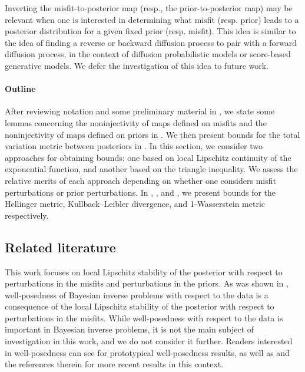 \documentclass[a4paper]{scrartcl}
\theoremstyle{definition}
\numberwithin{equation}{section}
\begin{document}
Inverting the misfit-to-posterior map (resp., the prior-to-posterior map) may be relevant when one is interested in determining what misfit (resp. prior) leads to a posterior distribution for a given fixed prior (resp. misfit).
This idea is similar to the idea of finding a reverse or backward diffusion process to pair with a forward diffusion process, in the context of diffusion probabilistic models or score-based generative models. We defer the investigation of this idea to future work. 

\paragraph{Outline} After reviewing notation and some preliminary material in , we state some lemmas concerning the noninjectivity of maps defined on misfits and the noninjectivity of maps defined on priors in .
We then present bounds for the total variation metric between posteriors in .
In this section, we consider two approaches for obtaining bounds: one based on local Lipschitz continuity of the exponential function, and another based on the triangle inequality. We assess the relative merits of each approach depending on whether one considers misfit perturbations or prior perturbations.
In , , and , we present bounds for the Hellinger metric, Kullback--Leibler divergence, and 1-Wasserstein metric respectively.

\subsection{Related literature}

This work focuses on local Lipschitz stability of the posterior with respect to perturbations in the misfits and perturbations in the priors. 
As was shown in \cite{Sprungk2020}, well-posedness of Bayesian inverse problems with respect to the data is a consequence of the local Lipschitz stability of the posterior with respect to perturbations in the misfits.
While well-posedness with respect to the data is important in Bayesian inverse problems, it is not the main subject of investigation in this work, and we do not consider it further. Readers interested in well-posedness can see \cite[Section 4]{Stuart2010} for prototypical well-posedness results, as well as \cite{Latz2023} and the references therein for more recent results in this context.
\end{document}
